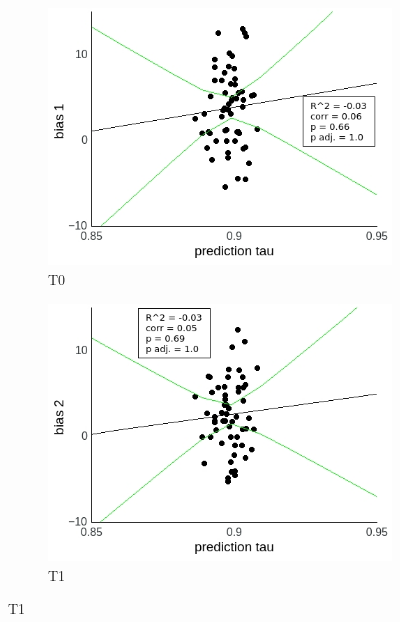 \documentclass[a4paper]{scrreprt}
\begin{document}
\begin{figure}
\centering
\begin{subfigure}[b]{0.49\textwidth}
        \includegraphics[width=\textwidth]{figs/sec3/pred/predno_diff_1_mod2mod2.jpeg}
        \caption{T0}
    \end{subfigure}
    \begin{subfigure}[b]{0.49\textwidth}
        \includegraphics[width=\textwidth]{figs/sec3/pred/predno_diff_2_mod2mod2.jpeg}
        \caption{T1}
    \end{subfigure}


\end{figure}
\end{document}

